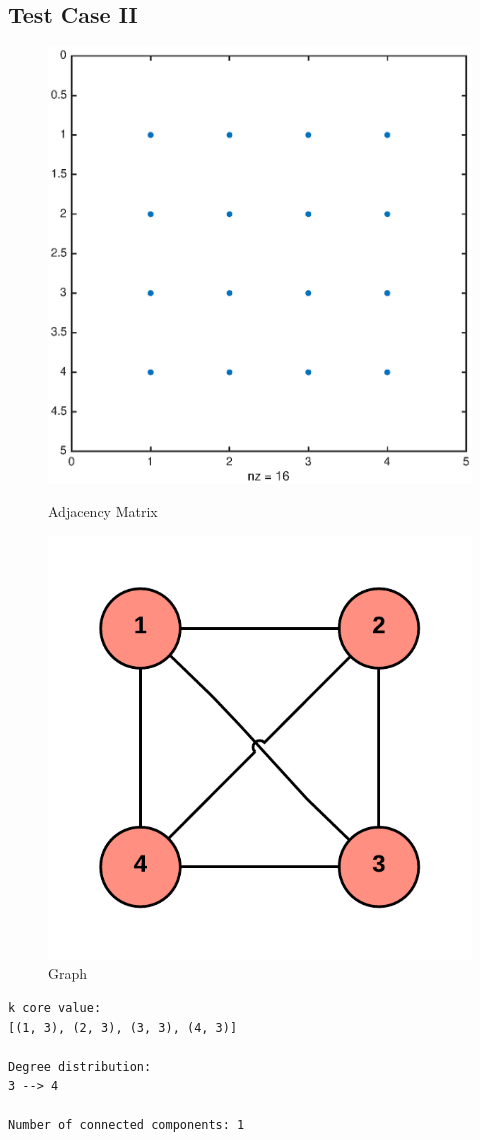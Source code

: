 \subsection{Test Case II}

\begin{figure}[H]
  \includegraphics[width=\linewidth]{spy2.eps}
  \caption{Adjacency Matrix}
\endminipage\hfill
{}
  \includegraphics[width=\linewidth]{graph2}
  \caption{Graph}
\endminipage
\end{figure}
\begin{verbatim}
k core value:
[(1, 3), (2, 3), (3, 3), (4, 3)]

Degree distribution:
3 --> 4

Number of connected components: 1
\end{verbatim}

